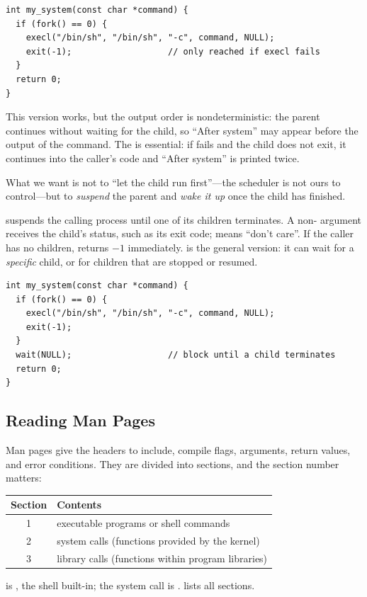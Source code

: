\begin{example}
\begin{lstlisting}
int my_system(const char *command) {
  if (fork() == 0) {
    execl("/bin/sh", "/bin/sh", "-c", command, NULL);
    exit(-1);                   // only reached if execl fails
  }
  return 0;
}
\end{lstlisting}
  This version works, but the output order is nondeterministic: the parent continues without waiting for the child, so ``After system'' may appear before the output of the command. The  is essential: if  fails and the child does not exit, it continues into the caller's code and ``After system'' is printed twice.
\end{example}

What we want is not to ``let the child run first''---the scheduler is not ours to control---but to \emph{suspend} the parent and \emph{wake it up} once the child has finished.

\begin{definition}
   suspends the calling process until one of its children terminates. A non- argument receives the child's status, such as its exit code;  means ``don't care''. If the caller has no children,  returns $-1$ immediately.  is the general version: it can wait for a \emph{specific} child, or for children that are stopped or resumed.
\end{definition}

\begin{example}
\begin{lstlisting}
int my_system(const char *command) {
  if (fork() == 0) {
    execl("/bin/sh", "/bin/sh", "-c", command, NULL);
    exit(-1);
  }
  wait(NULL);                   // block until a child terminates
  return 0;
}
\end{lstlisting}
\end{example}

\subsection{Reading Man Pages}

Man pages give the headers to include, compile flags, arguments, return values, and error conditions. They are divided into sections, and the section number matters:
\begin{center}
\begin{tabular}{cl}
  \toprule
  Section & Contents \\
  \midrule
  1 & executable programs or shell commands \\
  2 & system calls (functions provided by the kernel) \\
  3 & library calls (functions within program libraries) \\
  \bottomrule
\end{tabular}
\end{center}
 is , the shell built-in; the system call is .  lists all sections.

